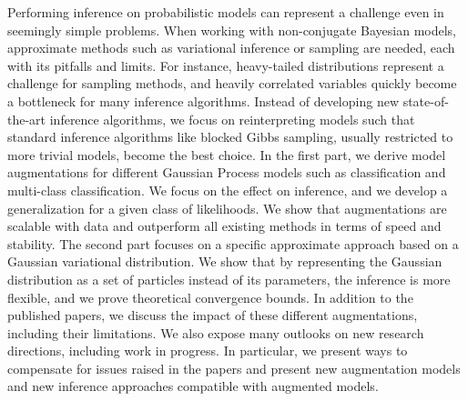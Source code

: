 
\ifCLASSINFOlangDE
{}
\fi

\begin{abstracts}        %
Performing inference on probabilistic models can represent a challenge even in seemingly simple problems.
When working with non-conjugate Bayesian models, approximate methods such as variational inference or sampling are needed, each with its pitfalls and limits.
For instance, heavy-tailed distributions represent a challenge for sampling methods, and heavily correlated variables quickly become a bottleneck for many inference algorithms.
Instead of developing new state-of-the-art inference algorithms, we focus on reinterpreting models such that standard inference algorithms like blocked Gibbs sampling, usually restricted to more trivial models, become the best choice.
In the first part, we derive model augmentations for different Gaussian Process models such as classification and multi-class classification.
We focus on the effect on inference, and we develop a generalization for a given class of likelihoods.
We show that augmentations are scalable with data and outperform all existing methods in terms of speed and stability.
The second part focuses on a specific approximate approach based on a Gaussian variational distribution.
We show that by representing the Gaussian distribution as a set of particles instead of its parameters, the inference is more flexible, and we prove theoretical convergence bounds.
In addition to the published papers, we discuss the impact of these different augmentations, including their limitations.
We also expose many outlooks on new research directions, including work in progress.
In particular, we present ways to compensate for issues raised in the papers and present new augmentation models and new inference approaches compatible with augmented models.


\end{abstracts}
\ifCLASSINFOlangDE
{}
\fi

